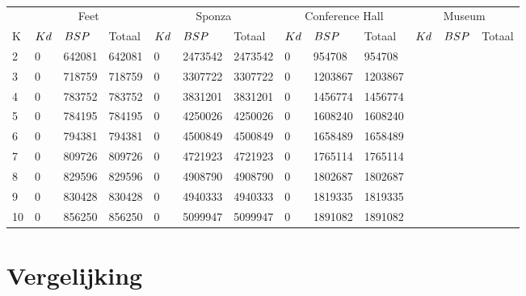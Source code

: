   \begin{table}
    \centering
    \begin{tabular}{@{}lllllllllllll@{}} \toprule
      & \multicolumn{3}{c}{Feet} & \multicolumn{3}{c}{Sponza} & \multicolumn{3}{c}{Conference Hall} & \multicolumn{3}{c}{Museum} \\ \cmidrule(r){2-4} \cmidrule(r){5-7} \cmidrule(r){8-10} \cmidrule(r){11-13}
      K      & $Kd$     & $BSP$ & Totaal & $Kd$  & $BSP$ & Totaal & $Kd$     & $BSP$ & Totaal & $Kd$     & $BSP$ & Totaal \\ \midrule
      2      &  0   & 642081 & 642081  & 0 & 2473542 & 2473542 & 0 & 954708 & 954708 & & &\\
      3      &  0   & 718759 & 718759  & 0 & 3307722 & 3307722 & 0 & 1203867 & 1203867 & & &\\
      4      &  0   & 783752 & 783752  & 0 & 3831201 & 3831201 & 0 & 1456774 & 1456774 & & &\\
      5      &  0   & 784195 & 784195  & 0 & 4250026 & 4250026 & 0 & 1608240 & 1608240 & & &\\
      6      &  0   & 794381 & 794381  & 0 & 4500849 & 4500849 & 0 & 1658489 & 1658489 & & &\\
      7      &  0   & 809726 & 809726  & 0 & 4721923 & 4721923 & 0 & 1765114 & 1765114 & & &\\
      8      &  0   & 829596 & 829596  & 0 & 4908790 & 4908790 & 0 & 1802687 & 1802687 & & &\\
      9      &  0   & 830428 & 830428  & 0 & 4940333 & 4940333 & 0 & 1819335 & 1819335 & & &\\
      10      & 0   & 856250 & 856250  & 0 & 5099947 & 5099947 & 0 & 1891082 & 1891082 & & &\\ \bottomrule
    \end{tabular}
    \caption{}
    \label{tab:bsprandom-k-boomvgl}
  \end{table}
\section{Vergelijking}


